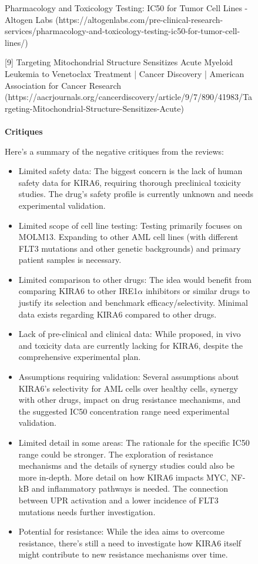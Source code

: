 \begin{figure}[htbp!]
\begin{tcolorbox}[
    colback=black!5!white,
    colframe=black!60!white,
    title=\textbf{KIRA6 for AML (continued)},
    fonttitle=\bfseries,
    arc=3mm,
    boxrule=1pt,
    bottomrule=2pt,
]
[8] Pharmacology and Toxicology Testing: IC50 for Tumor Cell Lines - Altogen Labs
(https://altogenlabs.com/pre-clinical-research-services/pharmacology-and-toxicology-testing-ic50-for-tumor-cell-lines/)

[9] Targeting Mitochondrial Structure Sensitizes Acute Myeloid Leukemia to Venetoclax Treatment | Cancer Discovery | American Association for Cancer Research
(https://aacrjournals.org/cancerdiscovery/article/9/7/890/41983/Targeting-Mitochondrial-Structure-Sensitizes-Acute)
\\
\\
\textbf{Critiques}

Here's a summary of the negative critiques from the reviews:
\begin{itemize}
    \item Limited safety data: The biggest concern is the lack of human safety data for KIRA6, requiring thorough preclinical toxicity studies.  The drug's safety profile is currently unknown and needs experimental validation.
    \item Limited scope of cell line testing:  Testing primarily focuses on MOLM13. Expanding to other AML cell lines (with different FLT3 mutations and other genetic backgrounds) and primary patient samples is necessary.
    \item Limited comparison to other drugs:  The idea would benefit from comparing KIRA6 to other IRE1$\alpha$ inhibitors or similar drugs to justify its selection and benchmark efficacy/selectivity. Minimal data exists regarding KIRA6 compared to other drugs.
    \item Lack of pre-clinical and clinical data:  While proposed, in vivo and toxicity data are currently lacking for KIRA6, despite the comprehensive experimental plan.
    \item Assumptions requiring validation: Several assumptions about KIRA6's selectivity for AML cells over healthy cells, synergy with other drugs, impact on drug resistance mechanisms, and the suggested IC50 concentration range need experimental validation.
    \item Limited detail in some areas: The rationale for the specific IC50 range could be stronger. The exploration of resistance mechanisms and the details of synergy studies could also be more in-depth. More detail on how KIRA6 impacts MYC, NF-kB and inflammatory pathways is needed.  The connection between UPR activation and a lower incidence of FLT3 mutations needs further investigation.
    \item Potential for resistance: While the idea aims to overcome resistance, there's still a need to investigate how KIRA6 itself might contribute to new resistance mechanisms over time.
\end{itemize}


\end{tcolorbox}
\end{figure}
